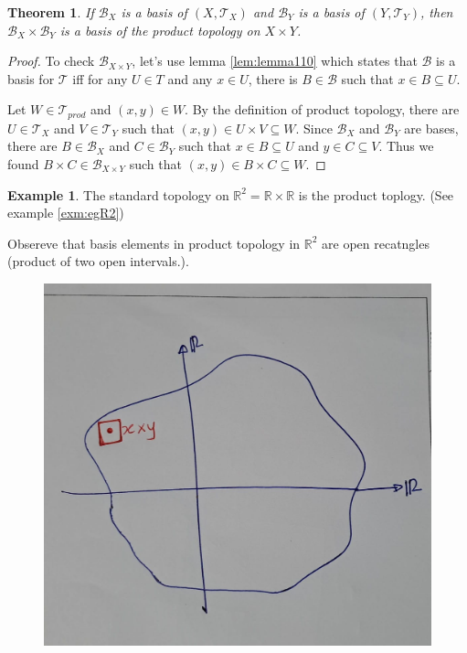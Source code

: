 \documentclass[
]{book}
\newtheorem{theorem}{Theorem}[chapter]
\theoremstyle{definition}
\theoremstyle{definition}
\newtheorem{example}{Example}[chapter]
\theoremstyle{definition}
\theoremstyle{definition}
\theoremstyle{remark}
\begin{document}
\begin{theorem}
\protect\hypertarget{thm:unnamed-chunk-36}{}\label{thm:unnamed-chunk-36}If \(\mathcal{B}_X\) is a basis of \((X, \mathcal{T}_X)\) and \(\mathcal{B}_Y\) is a basis of \((Y, \mathcal{T}_Y)\), then \(\mathcal{B}_X \times \mathcal{B}_Y\) is a basis of the product topology on \(X \times Y\).
\end{theorem}

\begin{proof}
To check \(\mathcal{B}_{X \times Y}\), let's use lemma \ref{lem:lemma110} which states that \(\mathcal{B}\) is a basis for \(\mathcal{T}\) iff for any \(U \in T\) and any \(x \in U\), there is \(B \in \mathcal{B}\) such that \(x \in B \subseteq U\).

Let \(W \in \mathcal{T}_{prod}\) and \((x, y) \in W\). By the definition of product topology, there are \(U \in \mathcal{T}_X\) and \(V \in \mathcal{T}_Y\) such that \((x,y) \in U \times V \subseteq W\). Since \(\mathcal{B}_X\) and \(\mathcal{B}_Y\) are bases, there are \(B \in \mathcal{B}_X\) and \(C \in \mathcal{B}_Y\) such that \(x \in B \subseteq U\) and \(y \in C \subseteq V\). Thus we found \(B \times C \in \mathcal{B}_{X \times Y}\) such that \((x,y) \in B \times C \subseteq W\).
\end{proof}

\begin{example}
\protect\hypertarget{exm:unnamed-chunk-38}{}\label{exm:unnamed-chunk-38}The standard topology on \(\mathbb{R}^2=\mathbb{R}\times\mathbb{R}\) is the product toplogy. (See example \ref{exm:egR2})

Obsereve that basis elements in product topology in \(\mathbb{R}^2\) are open recatngles (product of two open intervals.).
\end{example}

\begin{figure}
\centering
\includegraphics{figures/figure 10.jpg}
\caption{\label{fig:fig10}\(~\)}
\end{figure}
\end{document}
